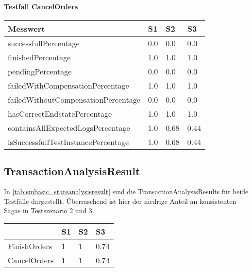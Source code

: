 \paragraph*{Testfall CancelOrders}

\begin{center}
	\fontsize{9}{12}\selectfont
	\begin{longtable}[h]{|p{5cm}|p{1cm}|p{1cm}|p{1cm}|}
		\hline
		Messwert & S1 & S2 & S3 \\ \hline
		\endhead
		\endfoot
		successfull\-Percentage & 0.0 & 0.0 & 0.0 \\ \hline
		finished\-Percentage & 1.0 & 1.0 & 1.0 \\ \hline
		pending\-Percentage & 0.0 & 0.0 & 0.0 \\ \hline
		failedWithCompensation\-Percentage & 1.0 & 1.0 & 1.0 \\ \hline
		failedWithoutCompensation\-Percentage & 0.0 & 0.0 & 0.0 \\ \hline
		hasCorrectEndstate\-Percentage & 1.0 & 1.0 & 1.0 \\ \hline
		containsAllExpectedLogs\-Percentage & 1.0 & 0.68 & 0.44 \\ \hline
		isSuccessfullTestInstance\-Percentage & 1.0 & 0.68 & 0.44 \\ \hline
	\end{longtable}
\end{center}
\FloatBarrier

\subsection{TransactionAnalysisResult}
In \cref{tab:smbasic_stateanalysisresult} sind die TransactionAnalysisResults für beide Testfälle dargestellt. Überraschend ist hier der niedrige Anteil an konsistenten Sagas in Testszenario 2 und 3. 

\begin{center}
	\fontsize{9}{12}\selectfont
	\begin{longtable}[h]{|p{5cm}|p{1cm}|p{1cm}|p{1cm}|}
		\hline
		& S1 & S2 & S3 \\ \hline
		\endhead
		\endfoot
		FinishOrders & 1 & 1 & 0.74\\ \hline	
		CancelOrders & 1 & 1 & 0.74\\ \hline
	\end{longtable}
\end{center}
\FloatBarrier

